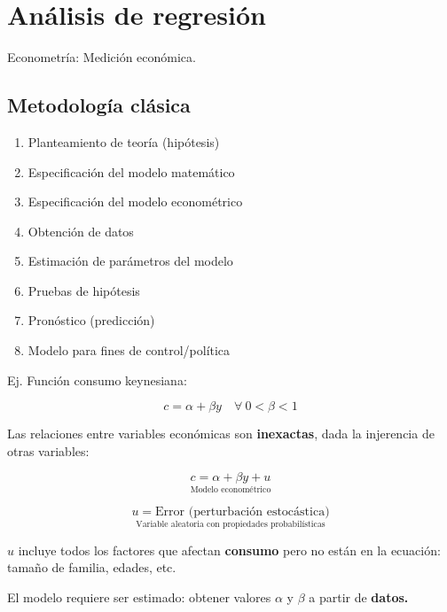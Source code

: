 \documentclass[
]{book}
\providecommand{\tightlist}{%
  \setlength{\itemsep}{0pt}\setlength{\parskip}{0pt}}
\begin{document}
\hypertarget{anuxe1lisis-de-regresiuxf3n}{%
\chapter{Análisis de regresión}\label{anuxe1lisis-de-regresiuxf3n}}

Econometría: Medición económica.

\hypertarget{metodologuxeda-cluxe1sica}{%
\section{Metodología clásica}\label{metodologuxeda-cluxe1sica}}

\begin{enumerate}
\def\labelenumi{\arabic{enumi}.}
\tightlist
\item
  Planteamiento de teoría (hipótesis)\\
\item
  Especificación del modelo matemático\\
\item
  Especificación del modelo econométrico\\
\item
  Obtención de datos\\
\item
  Estimación de parámetros del modelo\\
\item
  Pruebas de hipótesis\\
\item
  Pronóstico (predicción)\\
\item
  Modelo para fines de control/política
\end{enumerate}

Ej. Función consumo keynesiana:

\[
c = \alpha + \beta y \quad \forall \ 0< \beta <1
\]

Las relaciones entre variables económicas son \textbf{inexactas}, dada la injerencia de otras variables:

\[ 
\underset{\text{Modelo econométrico} }{c = \alpha + \beta y + u}
\]

\[ 
\underset{ \text{Variable aleatoria con propiedades probabilísticas} }{ u = \text{Error (perturbación estocástica)} } 
\]

\(u\) incluye todos los factores que afectan \textbf{consumo} pero no están en la ecuación: tamaño de familia, edades, etc.

El modelo requiere ser estimado: obtener valores \(\alpha\) y \(\beta\) a partir de \textbf{datos.}
\end{document}
